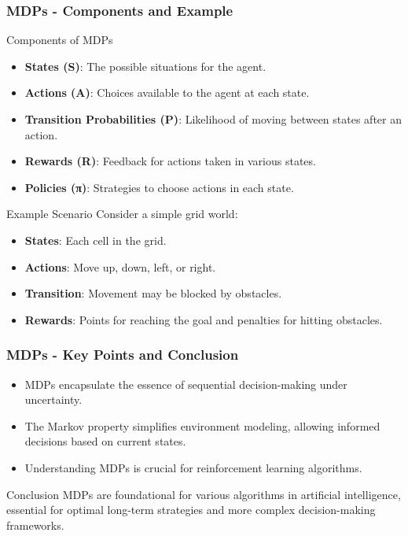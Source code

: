 \documentclass[aspectratio=169]{beamer}
\begin{document}
\begin{frame}[fragile]
    \frametitle{MDPs - Components and Example}
    \begin{block}{Components of MDPs}
        \begin{itemize}
            \item \textbf{States (S)}: The possible situations for the agent.
            \item \textbf{Actions (A)}: Choices available to the agent at each state.
            \item \textbf{Transition Probabilities (P)}: Likelihood of moving between states after an action.
            \item \textbf{Rewards (R)}: Feedback for actions taken in various states.
            \item \textbf{Policies (π)}: Strategies to choose actions in each state.
        \end{itemize}
    \end{block}

    \begin{block}{Example Scenario}
        Consider a simple grid world:
        \begin{itemize}
            \item \textbf{States}: Each cell in the grid.
            \item \textbf{Actions}: Move up, down, left, or right.
            \item \textbf{Transition}: Movement may be blocked by obstacles.
            \item \textbf{Rewards}: Points for reaching the goal and penalties for hitting obstacles.
        \end{itemize}
    \end{block}
\end{frame}

\begin{frame}[fragile]
    \frametitle{MDPs - Key Points and Conclusion}
    \begin{itemize}
        \item MDPs encapsulate the essence of sequential decision-making under uncertainty.
        \item The Markov property simplifies environment modeling, allowing informed decisions based on current states.
        \item Understanding MDPs is crucial for reinforcement learning algorithms.
    \end{itemize}
    
    \begin{block}{Conclusion}
        MDPs are foundational for various algorithms in artificial intelligence, essential for optimal long-term strategies and more complex decision-making frameworks.
    \end{block}
\end{frame}
\end{document}

